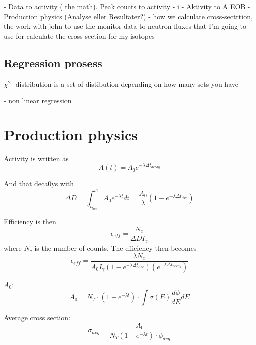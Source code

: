 \documentclass[twoside,english]{uiofysmaster/uiofysmaster}
\begin{document}
 
- Data to activity ( the math). Peak counts to activity
- i - Aktivity to A$\_$EOB
- Production physics (Analyse eller Resultater?) - how we calculate cross-sectrtion, the work with john to use the monitor data to neutron fluxes that I’m going to use for calculate the cross section for my isotopes



\subsection{Regression prosess}

$\chi^2$- distribution is a set of distibution depending on how many sets you have 

- non linear regression

\section{Production physics}
\label{sec: prod_physics}

Activity is written as \begin{equation}
A(t) = A_0 e^{-\lambda \Delta t_{decay}}
\end{equation}

And that deca0ys with \begin{equation}
\Delta D = \int_{t_{live}}^{t1} A_0 e^{-\lambda t} dt = \frac{A_0}{\lambda} (1- e^{-\lambda \Delta t_{live}})
\end{equation}

Efficiency is then \begin{equation}
\epsilon_{eff} = \frac{N_c}{\Delta D I_{\gamma}} 
\end{equation}
where $N_c$ is the number of counts.
The efficiency then becomes \begin{equation}
\epsilon_{eff} = \frac{\lambda N_c}{A_0 I_{\gamma} (1 - e^{-\lambda \Delta t_{live}}) (e^{-\lambda \Delta t_{decay}})}
\end{equation}



$A_0$: \begin{equation}
A_0 = N_T \cdot (1-e^{-\lambda t}) \cdot \int \sigma(E) \frac{d\phi}{dE} dE
\end{equation}


Average cross section: \begin{equation}
\sigma_{avg} = \frac{A_0}{N_T (1-e^{-\lambda t}) \cdot \phi_{avg}} 
\end{equation}
\end{document}
